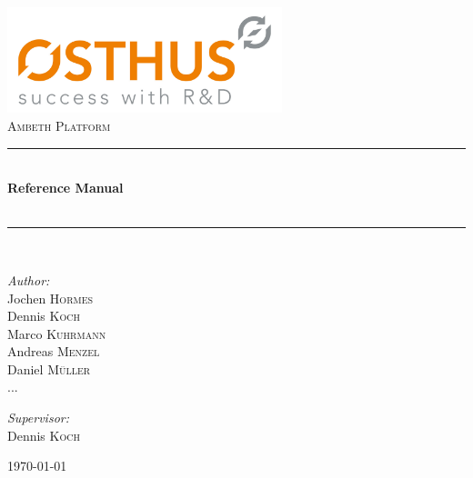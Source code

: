 \begin{titlepage}

\begin{center}


\includegraphics[width=0.6\textwidth]{img/2014-08-07-MG-Osthus_logo_RGB-high-res.jpg}\\[1cm]

\textsc{\huge Ambeth Platform}\\[1.5cm]

\newcommand{\HRule}{\rule{\linewidth}{0.5mm}}
\HRule \\[0.4cm]
{ \huge \bfseries Reference Manual}\\[0.4cm]
{ \huge \bfseries \version}\\[0.4cm]
\HRule \\[1.5cm]

\begin{minipage}{0.4\textwidth}
\begin{flushleft} \large
\emph{Author:}\\
Jochen \textsc{Hormes}\\
Dennis \textsc{Koch}\\
Marco \textsc{Kuhrmann}\\
Andreas \textsc{Menzel}\\
Daniel \textsc{M\"uller}\\
...
\end{flushleft}
\end{minipage}
\hfill
\begin{minipage}{0.4\textwidth}
\begin{flushright} \large
\emph{Supervisor:} \\
Dennis \textsc{Koch}
\end{flushright}
\end{minipage}

\vfill

{\large \today}

\end{center}

\end{titlepage}
